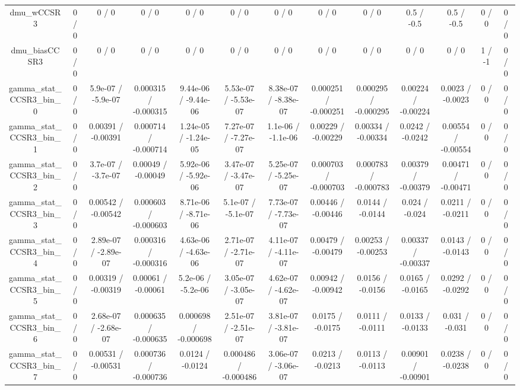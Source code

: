\documentclass[10pt]{article}
\begin{document}
\begin{table}[htbp]
\begin{center}
\begin{tabular}{|c|c|c|c|c|c|c|c|c|c|c|c|c|}
  dmu_wCCSR3 & 0 / 0 & 0 / 0 & 0 / 0 & 0 / 0 & 0 / 0 & 0 / 0 & 0 / 0 & 0 / 0 & 0.5 / -0.5 & 0.5 / -0.5 & 0 / 0 & 0 / 0 \\ 
  dmu_biasCCSR3 & 0 / 0 & 0 / 0 & 0 / 0 & 0 / 0 & 0 / 0 & 0 / 0 & 0 / 0 & 0 / 0 & 0 / 0 & 0 / 0 & 1 / -1 & 0 / 0 \\ 
  gamma_stat_CCSR3_bin_0 & 0 / 0 & 5.9e-07 / -5.9e-07 & 0.000315 / -0.000315 & 9.44e-06 / -9.44e-06 & 5.53e-07 / -5.53e-07 & 8.38e-07 / -8.38e-07 & 0.000251 / -0.000251 & 0.000295 / -0.000295 & 0.00224 / -0.00224 & 0.0023 / -0.0023 & 0 / 0 & 0 / 0 \\ 
  gamma_stat_CCSR3_bin_1 & 0 / 0 & 0.00391 / -0.00391 & 0.000714 / -0.000714 & 1.24e-05 / -1.24e-05 & 7.27e-07 / -7.27e-07 & 1.1e-06 / -1.1e-06 & 0.00229 / -0.00229 & 0.00334 / -0.00334 & 0.0242 / -0.0242 & 0.00554 / -0.00554 & 0 / 0 & 0 / 0 \\ 
  gamma_stat_CCSR3_bin_2 & 0 / 0 & 3.7e-07 / -3.7e-07 & 0.00049 / -0.00049 & 5.92e-06 / -5.92e-06 & 3.47e-07 / -3.47e-07 & 5.25e-07 / -5.25e-07 & 0.000703 / -0.000703 & 0.000783 / -0.000783 & 0.00379 / -0.00379 & 0.00471 / -0.00471 & 0 / 0 & 0 / 0 \\ 
  gamma_stat_CCSR3_bin_3 & 0 / 0 & 0.00542 / -0.00542 & 0.000603 / -0.000603 & 8.71e-06 / -8.71e-06 & 5.1e-07 / -5.1e-07 & 7.73e-07 / -7.73e-07 & 0.00446 / -0.00446 & 0.0144 / -0.0144 & 0.024 / -0.024 & 0.0211 / -0.0211 & 0 / 0 & 0 / 0 \\ 
  gamma_stat_CCSR3_bin_4 & 0 / 0 & 2.89e-07 / -2.89e-07 & 0.000316 / -0.000316 & 4.63e-06 / -4.63e-06 & 2.71e-07 / -2.71e-07 & 4.11e-07 / -4.11e-07 & 0.00479 / -0.00479 & 0.00253 / -0.00253 & 0.00337 / -0.00337 & 0.0143 / -0.0143 & 0 / 0 & 0 / 0 \\ 
  gamma_stat_CCSR3_bin_5 & 0 / 0 & 0.00319 / -0.00319 & 0.00061 / -0.00061 & 5.2e-06 / -5.2e-06 & 3.05e-07 / -3.05e-07 & 4.62e-07 / -4.62e-07 & 0.00942 / -0.00942 & 0.0156 / -0.0156 & 0.0165 / -0.0165 & 0.0292 / -0.0292 & 0 / 0 & 0 / 0 \\ 
  gamma_stat_CCSR3_bin_6 & 0 / 0 & 2.68e-07 / -2.68e-07 & 0.000635 / -0.000635 & 0.000698 / -0.000698 & 2.51e-07 / -2.51e-07 & 3.81e-07 / -3.81e-07 & 0.0175 / -0.0175 & 0.0111 / -0.0111 & 0.0133 / -0.0133 & 0.031 / -0.031 & 0 / 0 & 0 / 0 \\ 
  gamma_stat_CCSR3_bin_7 & 0 / 0 & 0.00531 / -0.00531 & 0.000736 / -0.000736 & 0.0124 / -0.0124 & 0.000486 / -0.000486 & 3.06e-07 / -3.06e-07 & 0.0213 / -0.0213 & 0.0113 / -0.0113 & 0.00901 / -0.00901 & 0.0238 / -0.0238 & 0 / 0 & 0 / 0 \\ 

\end{tabular}
\end{center}
\end{table}
\end{document}
